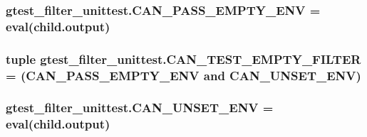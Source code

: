 \subsubsection[{\texorpdfstring{C\+A\+N\+\_\+\+P\+A\+S\+S\+\_\+\+E\+M\+P\+T\+Y\+\_\+\+E\+NV}{CAN_PASS_EMPTY_ENV}}]{\setlength{\rightskip}{0pt plus 5cm}gtest\+\_\+filter\+\_\+unittest.\+C\+A\+N\+\_\+\+P\+A\+S\+S\+\_\+\+E\+M\+P\+T\+Y\+\_\+\+E\+NV = eval(child.\+output)}\hypertarget{namespacegtest__filter__unittest_a3ac12d5141273a483e2fd6d44ab2eef0}{}\label{namespacegtest__filter__unittest_a3ac12d5141273a483e2fd6d44ab2eef0}
\subsubsection[{\texorpdfstring{C\+A\+N\+\_\+\+T\+E\+S\+T\+\_\+\+E\+M\+P\+T\+Y\+\_\+\+F\+I\+L\+T\+ER}{CAN_TEST_EMPTY_FILTER}}]{\setlength{\rightskip}{0pt plus 5cm}tuple gtest\+\_\+filter\+\_\+unittest.\+C\+A\+N\+\_\+\+T\+E\+S\+T\+\_\+\+E\+M\+P\+T\+Y\+\_\+\+F\+I\+L\+T\+ER = ({\bf C\+A\+N\+\_\+\+P\+A\+S\+S\+\_\+\+E\+M\+P\+T\+Y\+\_\+\+E\+NV} and {\bf C\+A\+N\+\_\+\+U\+N\+S\+E\+T\+\_\+\+E\+NV})}\hypertarget{namespacegtest__filter__unittest_a7afca8c162042da19f58cb569805d627}{}\label{namespacegtest__filter__unittest_a7afca8c162042da19f58cb569805d627}
\subsubsection[{\texorpdfstring{C\+A\+N\+\_\+\+U\+N\+S\+E\+T\+\_\+\+E\+NV}{CAN_UNSET_ENV}}]{\setlength{\rightskip}{0pt plus 5cm}gtest\+\_\+filter\+\_\+unittest.\+C\+A\+N\+\_\+\+U\+N\+S\+E\+T\+\_\+\+E\+NV = eval(child.\+output)}\hypertarget{namespacegtest__filter__unittest_ab9e86ba00496d09ea6830a60e3eb3cc0}{}\label{namespacegtest__filter__unittest_ab9e86ba00496d09ea6830a60e3eb3cc0}
